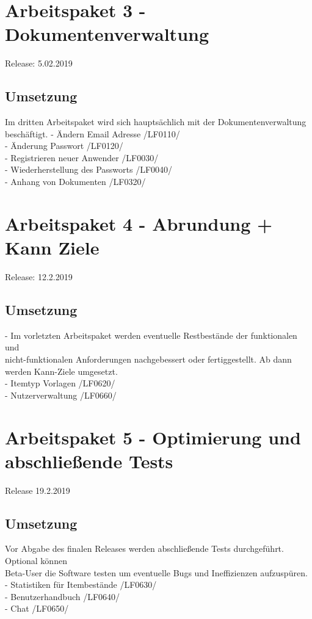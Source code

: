 \documentclass[11pt,a4paper]{report}
\begin{document}
\section{Arbeitspaket 3 - Dokumentenverwaltung}
Release: 5.02.2019 \\
\subsection{Umsetzung}
Im dritten Arbeitspaket wird sich hauptsächlich mit der Dokumentenverwaltung beschäftigt. 
- Ändern Email Adresse /LF0110/ \\
- Änderung Passwort /LF0120/ \\
- Registrieren neuer Anwender /LF0030/ \\
- Wiederherstellung des Passworts /LF0040/ \\
- Anhang von Dokumenten /LF0320/ \\

\section{Arbeitspaket 4 - Abrundung + Kann Ziele }
Release: 12.2.2019 \\
\subsection{Umsetzung}
- Im vorletzten Arbeitspaket werden eventuelle Restbestände der funktionalen und\\ nicht-funktionalen Anforderungen nachgebessert oder fertiggestellt. Ab dann werden Kann-Ziele umgesetzt.\\
- Itemtyp Vorlagen /LF0620/ \\
- Nutzerverwaltung /LF0660/ \\
\section{Arbeitspaket 5 - Optimierung und abschließende Tests}
Release 19.2.2019 \\
\subsection{Umsetzung}
Vor Abgabe des finalen Releases werden abschließende Tests durchgeführt. Optional können\\ Beta-User die Software testen um eventuelle Bugs und Ineffizienzen aufzuspüren. \\
- Statistiken für Itembestände /LF0630/ \\
- Benutzerhandbuch /LF0640/ \\
- Chat /LF0650/ \\
\end{document}
